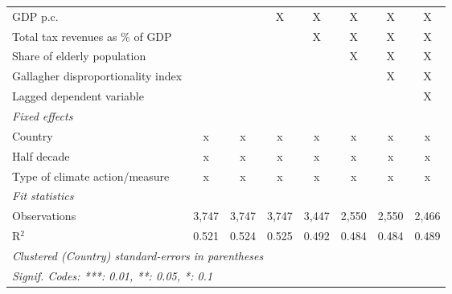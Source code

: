 \begin{table}[htbp]
\begin{tabular}{lccccccc}
      GDP p.c.                                                                                &                &               & X             & X             & X            & X            & X\\  
      Total tax revenues as \% of GDP                                                         &                &               &               & X             & X            & X            & X\\  
      Share of elderly population                                                             &                &               &               &               & X            & X            & X\\  
      Gallagher disproportionality index                                                      &                &               &               &               &              & X            & X\\  
      Lagged dependent variable                                                               &                &               &               &               &              &              & X\\  
      \emph{Fixed effects}\\
      Country                                                                                 & x              & x             & x             & x             & x            & x            & x\\  
      Half decade                                                                             & x              & x             & x             & x             & x            & x            & x\\  
      Type of climate action/measure                                                          & x              & x             & x             & x             & x            & x            & x\\  
      \midrule \emph{Fit statistics}\\
      Observations                                                                            & 3,747          & 3,747         & 3,747         & 3,447         & 2,550        & 2,550        & 2,466\\  
      R$^2$                                                                                   & 0.521          & 0.524         & 0.525         & 0.492         & 0.484        & 0.484        & 0.489\\  
      \midrule
      \multicolumn{8}{l}{\emph{Clustered (Country) standard-errors in parentheses}}\\
      \multicolumn{8}{l}{\emph{Signif. Codes: ***: 0.01, **: 0.05, *: 0.1}}\\
   \end{tabular}
\end{table}


